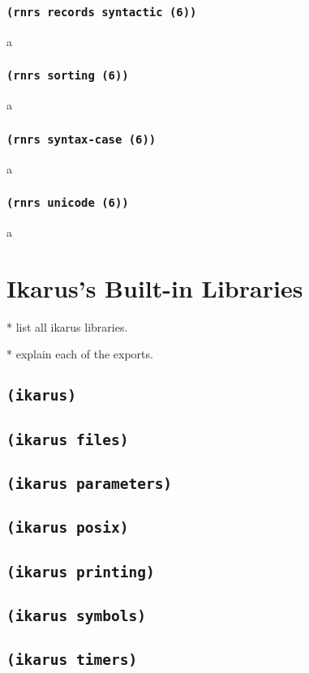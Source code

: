 \documentclass[onecolumn, 12pt, twoside, openright, dvipdfm]{book}
\begin{document}
\subsection{\texttt{(rnrs records syntactic (6))}}
a
\subsection{\texttt{(rnrs sorting (6))}}
a
\subsection{\texttt{(rnrs syntax-case (6))}}
a
\subsection{\texttt{(rnrs unicode (6))}}
a




\chapter{Ikarus's Built-in Libraries} 

* list all ikarus libraries.

* explain each of the exports.

\section{\label{lib:ikarus}\texttt{(ikarus)}}
\section{\texttt{(ikarus files)}}
\section{\texttt{(ikarus parameters)}}
\section{\texttt{(ikarus posix)}}
\section{\texttt{(ikarus printing)}}
\section{\texttt{(ikarus symbols)}}
\section{\texttt{(ikarus timers)}}
\end{document}
